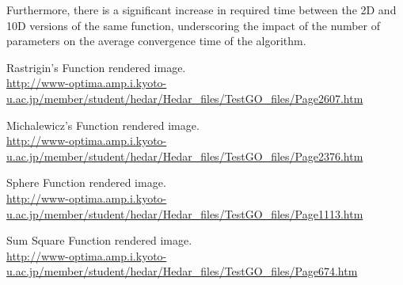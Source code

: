 \documentclass{article}
\begin{document}
Furthermore, there is a significant increase in required time between the 2D and 10D versions of the same function, underscoring the impact of the number of parameters on the average convergence time of the algorithm.


\clearpage
\begin{thebibliography}{9}

  Rastrigin's Function rendered image. \\
  \url{http://www-optima.amp.i.kyoto-u.ac.jp/member/student/hedar/Hedar_files/TestGO_files/Page2607.htm}

  Michalewicz's Function rendered image. \\
  \url{http://www-optima.amp.i.kyoto-u.ac.jp/member/student/hedar/Hedar_files/TestGO_files/Page2376.htm}

  Sphere Function rendered image. \\
  \url{http://www-optima.amp.i.kyoto-u.ac.jp/member/student/hedar/Hedar_files/TestGO_files/Page1113.htm}

  Sum Square Function rendered image. \\
  \url{http://www-optima.amp.i.kyoto-u.ac.jp/member/student/hedar/Hedar_files/TestGO_files/Page674.htm}

\end{thebibliography}  
\end{document}
